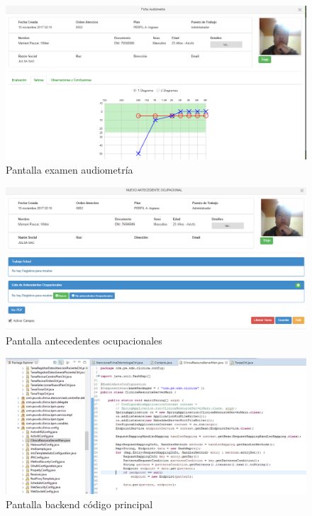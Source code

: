 	\begin{figure}[H]
	    \centering
		\includegraphics[width=18cm]{../imgs/ui/audiometria.png}
		\caption{Pantalla examen audiometría}
		\label{figure:audiometria}
	\end{figure}
	
	\begin{figure}[H]
	    \centering
		\includegraphics[width=18cm]{../imgs/ui/ocupacional.png}
		\caption{Pantalla antecedentes ocupacionales}
		\label{figure:ocupacional}
	\end{figure}
	
	\begin{figure}[H]
	    \centering
		\includegraphics[width=18cm]{../imgs/codigo/back-main.png}
		\caption{Pantalla backend código principal}
		\label{figure:back-main}
	\end{figure}
	
